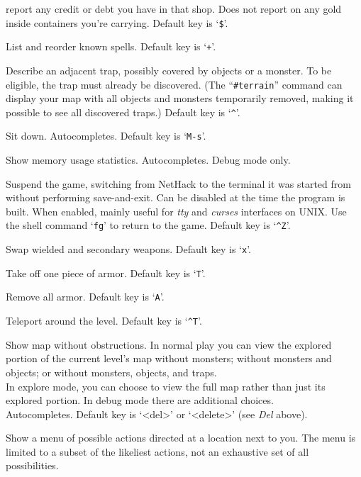 report any credit or debt you have in that shop.
Does not report on any gold inside containers you're carrying.
Default key is `{\tt \$}'.
\item[\tb{\#showspells}]
List and reorder known spells.
Default key is `{\tt +}'.
\item[\tb{\#showtrap}]
Describe an adjacent trap, possibly covered by objects or a monster.
To be eligible, the trap must already be discovered.
(The ``{\tt \#terrain}'' command can display your map with all objects and
monsters temporarily removed, making it possible to see all discovered
traps.)
Default key is `{\tt \^{}}'.
\item[\tb{\#sit}]
Sit down. Autocompletes. Default key is `{\tt M-s}'.
\item[\tb{\#stats}]
Show memory usage statistics.
Autocompletes.
Debug mode only.
\item[\tb{\#suspend}]
Suspend the game, switching from NetHack to the terminal it was started
from without performing save-and-exit.
Can be disabled at the time the program is built.
When enabled, mainly useful for {\it tty\/} and {\it curses\/} interfaces on
UNIX.
Use the shell command `{\tt fg}' to return to the game.
Default key is `{\tt \^{}Z}'.
\item[\tb{\#swap}]
Swap wielded and secondary weapons. Default key is `{\tt x}'.
\item[\tb{\#takeoff}]
Take off one piece of armor. Default key is `{\tt T}'.
\item[\tb{\#takeoffall}]
Remove all armor. Default key is `{\tt A}'.
\item[\tb{\#teleport}]
Teleport around the level. Default key is `{\tt \^{}T}'.
\item[\tb{\#terrain}]
Show map without obstructions.
In normal play you can view the explored portion of the current level's
map without monsters; without monsters and objects; or without monsters,
objects, and traps.\\
In explore mode, you can choose to view the full map rather than just
its explored portion.
In debug mode there are additional choices.\\
Autocompletes.
Default key is `<del>' or `<delete>' (see {\it Del\/} above).
\item[\tb{\#therecmdmenu}]
Show a menu of possible actions directed at a location next to you.
The menu is limited to a subset of the likeliest actions, not an
exhaustive set of all possibilities.

